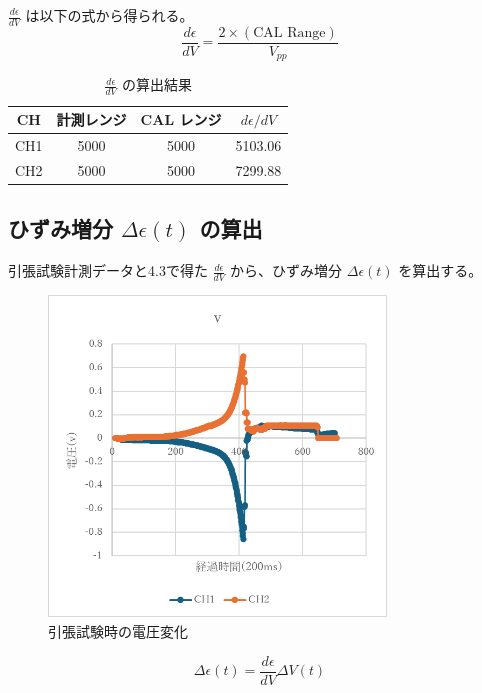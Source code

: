 \documentclass[11pt, a4paper, dvipdfmx]{jsreport}
\begin{document}
$\frac{d\epsilon}{dV}$ は以下の式から得られる。
$$
\frac{d\epsilon}{dV} = \frac{2 \times (\text{CAL Range})}{V_{pp}}
$$
\begin{table}[H]
    \centering
    \caption{$\frac{d\epsilon}{dV}$ の算出結果}
    \begin{tabular}{|c|c|c|c|}
        \hline
        CH & 計測レンジ & CAL レンジ & $d\epsilon/dV$ \\ \hline
        CH1 & 5000 & 5000 & 5103.06 \\ \hline
        CH2 & 5000 & 5000 & 7299.88 \\ \hline
    \end{tabular}
\end{table}

\subsection{ひずみ増分 $\Delta \epsilon (t)$ の算出}
引張試験計測データと4.3で得た $\frac{d\epsilon}{dV}$ から、ひずみ増分 $\Delta \epsilon (t)$ を算出する。
\begin{figure}[H]
    \centering
    \includegraphics[width=0.8\textwidth]{summer/ship-experiment/tension/pictures/strain_voltage.png}
    \caption{引張試験時の電圧変化}
    \label{fig:strain_voltage}
\end{figure}
$$
\Delta\epsilon(t) = \frac{d\epsilon}{dV}\Delta V(t)
$$
\end{document}
